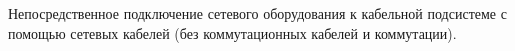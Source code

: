 Непосредственное подключение сетевого оборудования к кабельной
подсистеме с помощью сетевых кабелей (без коммутационных кабелей и коммутации).